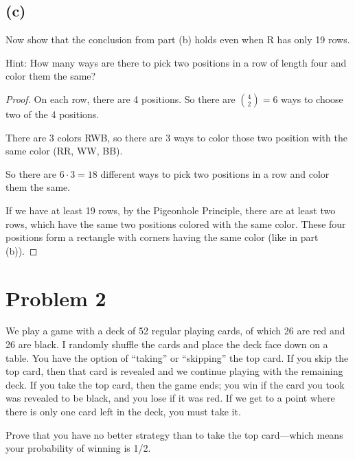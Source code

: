 \documentclass[14pt]{extarticle}
\begin{document}
\subsection{(c)}
Now show that the conclusion from part (b) holds even when R has only 19 rows.

Hint: How many ways are there to pick two positions in a row of length four and color them the same?
\begin{proof}
On each row, there are 4 positions. So there are $\binom{4}{2} = 6$ ways to choose two of the 4 positions.

There are 3 colors RWB, so there are 3 ways to color those two position with the same color (RR, WW, BB).

So there are $6 \cdot 3 = 18$ different ways to pick two positions in a row and color them the same.

If we have at least 19 rows, by the Pigeonhole Principle, there are at least two rows, which have the same two positions colored with the same color. These four positions form a rectangle with corners having the same color (like in part (b)).
\end{proof}

\section{Problem 2}
We play a game with a deck of 52 regular playing cards, of which 26 are red and 26 are black. I randomly shuffle the cards and place the deck face down on a table. You have the option of “taking” or “skipping”
the top card. If you skip the top card, then that card is revealed and we continue playing with the remaining deck. If you take the top card, then the game ends; you win if the card you took was revealed to be black, and you lose if it was red. If we get to a point where there is only one card left in the deck, you must take it.

Prove that you have no better strategy than to take the top card—which means your probability of winning is 1/2.
\end{document}
